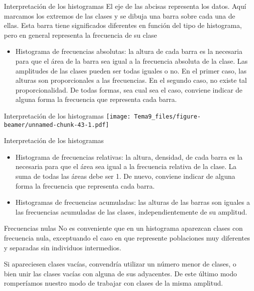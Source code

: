 \documentclass[
  ignorenonframetext,
]{beamer}
\providecommand{\tightlist}{%
  \setlength{\itemsep}{0pt}\setlength{\parskip}{0pt}}
\begin{document}
\begin{frame}{Interpretación de los histogramas}
\protect\hypertarget{interpretaciuxf3n-de-los-histogramas}{}
El eje de las abcisas representa los datos. Aquí marcamos los extremos
de las clases y se dibuja una barra sobre cada una de ellas. Esta barra
tiene significados diferentes en función del tipo de histograma, pero en
general representa la frecuencia de su clase

\begin{itemize}
\tightlist
\item
  Histograma de frecuencias absolutas: la altura de cada barra es la
  necesaria para que el área de la barra sea igual a la frecuencia
  absoluta de la clase. Las amplitudes de las clases pueden ser todas
  iguales o no. En el primer caso, las alturas son proporcionales a las
  frecuencias. En el segundo caso, no existe tal proporcionalidad. De
  todas formas, sea cual sea el caso, conviene indicar de alguna forma
  la frecuencia que representa cada barra.
\end{itemize}
\end{frame}

\begin{frame}{Interpretación de los histogramas}
\protect\hypertarget{interpretaciuxf3n-de-los-histogramas-1}{}
\texttt{[image: Tema9\_files/figure-beamer/unnamed-chunk-43-1.pdf]}
\end{frame}

\begin{frame}{Interpretación de los histogramas}
\protect\hypertarget{interpretaciuxf3n-de-los-histogramas-2}{}
\begin{itemize}
\tightlist
\item
  Histograma de frecuencias relativas: la altura, densidad, de cada
  barra es la necesaria para que el área sea igual a la frecuencia
  relativa de la clase. La suma de todas las áreas debe ser 1. De nuevo,
  conviene indicar de alguna forma la frecuencia que representa cada
  barra.
\item
  Histogramas de frecuencias acumuladas: las alturas de las barras son
  iguales a las frecuencias acumuladas de las clases, independientemente
  de su amplitud.
\end{itemize}
\end{frame}

\begin{frame}{Frecuencias nulas}
\protect\hypertarget{frecuencias-nulas}{}
No es conveniente que en un histograma aparezcan clases con frecuencia
nula, exceptuando el caso en que represente poblaciones muy diferentes y
separadas sin individuos intermedios.

Si apareciesen clases vacías, convendría utilizar un número menor de
clases, o bien unir las clases vacías con alguna de sus adyacentes. De
este último modo romperíamos nuestro modo de trabajar con clases de la
misma amplitud.
\end{frame}
\end{document}
